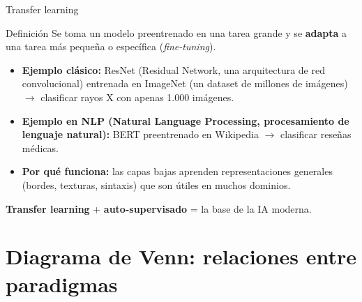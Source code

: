 \documentclass[aspectratio=169]{beamer}
\begin{document}
\begin{frame}{Transfer learning}
  \begin{block}{Definición}
    Se toma un modelo preentrenado en una tarea grande y se \textbf{adapta} a una tarea más pequeña o específica (\textit{fine-tuning}).
  \end{block}
  \bigskip
  \begin{itemize}
    \item \textbf{Ejemplo clásico:} ResNet (Residual Network, una arquitectura de red convolucional) entrenada en ImageNet (un dataset de millones de imágenes) $\rightarrow$ clasificar rayos X con apenas 1.000 imágenes.
    \item \textbf{Ejemplo en NLP (Natural Language Processing, procesamiento de lenguaje natural):} BERT preentrenado en Wikipedia $\rightarrow$ clasificar reseñas médicas.
    \item \textbf{Por qué funciona:} las capas bajas aprenden representaciones generales (bordes, texturas, sintaxis) que son útiles en muchos dominios.
  \end{itemize}
  \bigskip
  \textbf{Transfer learning} + \textbf{auto-supervisado} = la base de la IA moderna.
\end{frame}

\section{Diagrama de Venn: relaciones entre paradigmas}
\end{document}
